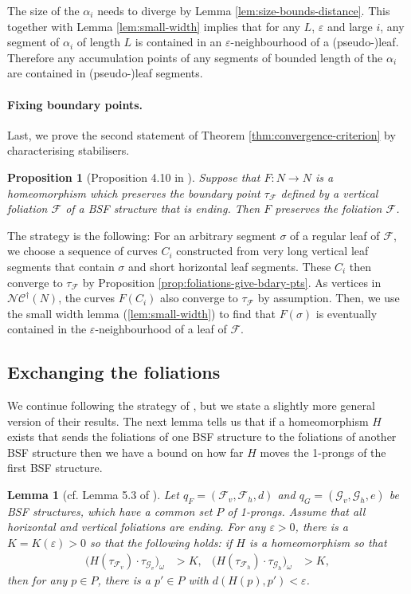 \documentclass[10pt,a4paper]{amsart}
\let\epsilon\varepsilon
\newtheorem{lemma}[theorem]{Lemma}
\newtheorem{proposition}[theorem]{Proposition}
\newcommand{\fncg}{\mathcal{NC}^\dagger}
\begin{document}
The size of the $\alpha_i$ needs to diverge by Lemma \ref{lem:size-bounds-distance}.
This together with Lemma \ref{lem:small-width} implies that for any $L$, $\epsilon$ and large $i$, any segment of $\alpha_i$ of length $L$ is contained in an $\epsilon$-neighbourhood of a (pseudo-)leaf.
Therefore any accumulation points of any segments of bounded length of the $\alpha_i$ are contained in (pseudo-)leaf segments.

\paragraph{Fixing boundary points.}
Last, we prove the second statement of Theorem \ref{thm:convergence-criterion} by characterising stabilisers.

\begin{proposition}[Proposition 4.10 in \cite{BHW2}]
Suppose that $F\colon N\rightarrow N$ is a homeomorphism which preserves the boundary point $\tau_\mathcal{F}$ defined by a vertical foliation $\mathcal{F}$ of a BSF structure that is ending.
Then $F$ preserves the foliation $\mathcal{F}$.
\end{proposition}

The strategy is the following:
For an arbitrary segment $\sigma$ of a regular leaf of $\mathcal{F}$, we choose a sequence of curves $C_i$ constructed from very long vertical leaf segments that contain $\sigma$ and short horizontal leaf segments.
These $C_i$ then converge to $\tau_\mathcal{F}$ by Proposition \ref{prop:foliations-give-bdary-pts}.
As vertices in $\fncg(N)$, the curves $F(C_i)$ also converge to $\tau_\mathcal{F}$ by assumption.
Then, we use the small width lemma (\ref{lem:small-width}) to find that $F(\sigma)$ is eventually contained in the $\epsilon$-neighbourhood of a leaf of $\mathcal{F}$.

\subsection{Exchanging the foliations}
We continue following the strategy of \cite{BHW2}, but we state a slightly more general version of their results.
The next lemma tells us that if a homeomorphism $H$ exists that sends the foliations of one BSF structure to the foliations of another BSF structure then we have a bound on how far $H$ moves the 1-prongs of the first BSF structure.

\begin{lemma}[cf. Lemma 5.3 of \cite{BHW2}]\label{lem:main-technical-lemma}
Let $q_F = (\mathcal{F}_v,\mathcal{F}_h,d)$ and $q_G = (\mathcal{G}_v,\mathcal{G}_h,e)$ be BSF structures, which have a common set $P$ of 1-prongs.
Assume that all horizontal and vertical foliations are ending.
For any $\epsilon > 0$, there is a $K=K(\epsilon) > 0$ so that the following holds:
if $H$ is a homeomorphism so that
\begin{align*}
    \big( H(\tau_{\mathcal{F}_v}) \cdot \tau_{\mathcal{G}_v} \big)_\omega &> K, & \big( H(\tau_{\mathcal{F}_h}) \cdot \tau_{\mathcal{G}_h} \big)_\omega &> K,
\end{align*}
then for any $p\in P$, there is a $p'\in P$ with $d(H(p),p') < \epsilon$.
\end{lemma}
\end{document}
